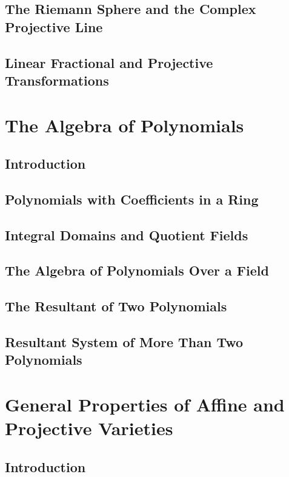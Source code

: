 \documentclass[12pt]{book}
\theoremstyle{plain}
\theoremstyle{definition}
\begin{document}
\section{The Riemann Sphere and the Complex Projective Line}

\section{Linear Fractional and Projective Transformations}

\chapter{The Algebra of Polynomials}

\section{Introduction}

\section{Polynomials with Coefficients in a Ring}

\section{Integral Domains and Quotient Fields}

\section{The Algebra of Polynomials Over a Field}

\section{The Resultant of Two Polynomials}

\section{Resultant System of More Than Two Polynomials}

\chapter{General Properties of Affine and Projective Varieties}

\section{Introduction}
\end{document}
